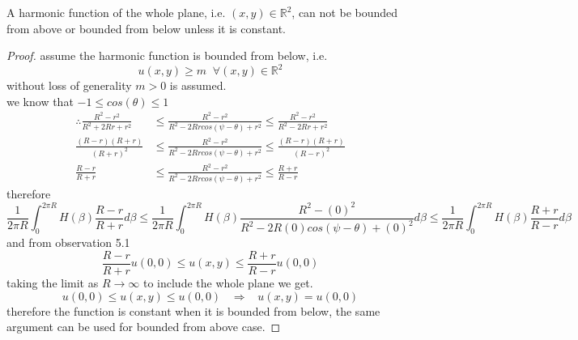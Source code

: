 \documentclass[]{article}
\begin{document}
\begin{theorem}
    A harmonic function of the whole plane, i.e. $(x,y) \in \mathbb{R}^2$, can not be bounded from above or bounded from below unless it is constant.    
\end{theorem}
\begin{proof}
    assume the harmonic function is bounded from below, i.e.    
    \[
        u(x,y) \geq m \;\; \forall (x,y) \in \mathbb{R}^2     
    \]
    without loss of generality $m > 0$ is assumed.
    \\
    we know that $ -1 \leq cos(\theta) \leq 1$
    \begin{align*}
        \therefore
        \frac{R^2-r^2}{R^2+2Rr+r^2} &\leq \frac{R^2-r^2}{R^2-2Rrcos(\psi  -\theta)+r^2} \leq \frac{R^2-r^2}{R^2-2Rr+r^2}
        \\
        \frac{(R-r)(R+r)}{{(R+r)}^2} &\leq \frac{R^2-r^2}{R^2-2Rrcos(\psi  -\theta)+r^2} \leq \frac{(R-r)(R+r)}{{(R-r)}^2}
        \\
        \frac{R-r}{R+r} &\leq \frac{R^2-r^2}{R^2-2Rrcos(\psi  -\theta)+r^2} \leq \frac{R+r}{R-r}
    \end{align*}
    therefore
    \[
        \frac{1}{2\pi R}\int_{0}^{2\pi R} H(\beta)\frac{R-r}{R+r} d\beta \leq \frac{1}{2\pi R}\int_{0}^{2\pi R} H(\beta)\frac{R^2-(0)^2}{R^2-2R(0)cos(\psi  -\theta)+(0)^2}d\beta \leq \frac{1}{2\pi R}\int_{0}^{2\pi R} H(\beta)\frac{R+r}{R-r} d\beta    
    \]
    and from observation 5.1 
    \[
        \frac{R-r}{R+r} u(0,0) \leq u(x,y) \leq \frac{R+r}{R-r} u(0,0)    
    \]
    taking the limit as $R \to \infty$ to include the whole plane we get.
    \[
        u(0,0) \leq u(x,y) \leq u(0,0) \;\;\; \Rightarrow \;\;\; u(x,y) = u(0,0)    
    \]
    therefore the function is constant when it is bounded from below, the same argument can be used for bounded from above case.
\end{proof}
\end{document}
